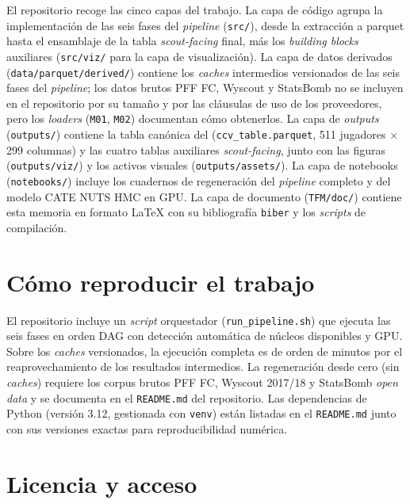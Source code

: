 El repositorio recoge las cinco capas del trabajo. La capa de código
agrupa la implementación de las seis fases del \textit{pipeline}
(\texttt{src/}), desde la extracción a parquet hasta el ensamblaje de
la tabla \textit{scout-facing} final, más los \textit{building blocks}
auxiliares (\texttt{src/viz/} para la capa de visualización). La capa
de datos derivados (\texttt{data/parquet/derived/}) contiene los
\textit{caches} intermedios versionados de las seis fases del
\textit{pipeline}; los datos brutos PFF FC, Wyscout y StatsBomb no se
incluyen en el repositorio por su tamaño y por las cláusulas de uso
de los proveedores, pero los \textit{loaders} (\texttt{M01}, \texttt{M02})
documentan cómo obtenerlos. La capa de \textit{outputs} (\texttt{outputs/})
contiene la tabla canónica del \CCV (\texttt{ccv\_table.parquet}, 511
jugadores $\times$ 299 columnas) y las cuatro tablas auxiliares
\textit{scout-facing}, junto con las figuras (\texttt{outputs/viz/})
y los activos visuales (\texttt{outputs/assets/}). La capa de
notebooks (\texttt{notebooks/}) incluye los cuadernos de regeneración
del \textit{pipeline} completo y del modelo CATE NUTS HMC en GPU. La
capa de documento (\texttt{TFM/doc/}) contiene esta memoria en
formato \LaTeX{} con su bibliografía \texttt{biber} y los \textit{scripts}
de compilación.

\section{Cómo reproducir el trabajo}
\label{anexo:repo-reproducibilidad}

El repositorio incluye un \textit{script} orquestador
(\texttt{run\_pipeline.sh}) que ejecuta las seis fases en orden DAG
con detección automática de núcleos disponibles y GPU. Sobre los
\textit{caches} versionados, la ejecución completa es de orden de
minutos por el reaprovechamiento de los resultados intermedios. La
regeneración desde cero (sin \textit{caches}) requiere los corpus
brutos PFF FC, Wyscout 2017/18 y StatsBomb \textit{open data} y se
documenta en el \texttt{README.md} del repositorio. Las dependencias
de Python (versión 3.12, gestionada con \texttt{venv}) están listadas
en el \texttt{README.md} junto con sus versiones exactas para
reproducibilidad numérica.

\section{Licencia y acceso}
\label{anexo:repo-licencia}

